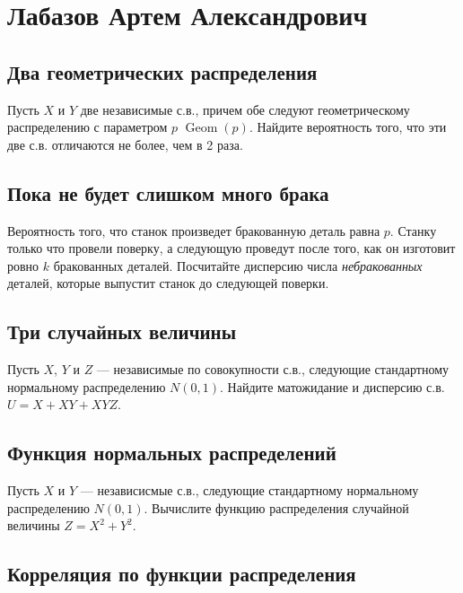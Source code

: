 \documentclass[12pt]{article}
\DeclareMathOperator{\Geom}{Geom}
\begin{document}
\newpage
\section{Лабазов Артем Александрович}

\subsection{Два геометрических распределения}

Пусть $X$ и $Y$ две независимые с.в., причем обе следуют геометрическому распределению с параметром $p$ $\Geom(p)$. Найдите вероятность того, что эти две с.в. отличаются не более, чем в 2 раза.



\subsection{Пока не будет слишком много брака}

Вероятность того, что станок произведет бракованную деталь равна $p$. Станку только что провели поверку, а следующую проведут после того, как он изготовит ровно $k$ бракованных деталей. Посчитайте дисперсию числа \emph{небракованных} деталей, которые выпустит станок до следующей поверки.



\subsection{Три случайных величины}

Пусть $X$, $Y$ и $Z$ --- независимые по совокупности с.в., следующие стандартному нормальному распределению $N(0, 1)$. Найдите матожидание и дисперсию с.в. $U = X + XY + XYZ$. 



\subsection{Функция нормальных распределений}

Пусть $X$ и $Y$ --- независисмые с.в., следующие стандартному нормальному распределению $N(0, 1)$. Вычислите функцию распределения случайной величины $Z = X^2 + Y^2$.



\subsection{Корреляция по функции распределения}
\end{document}
